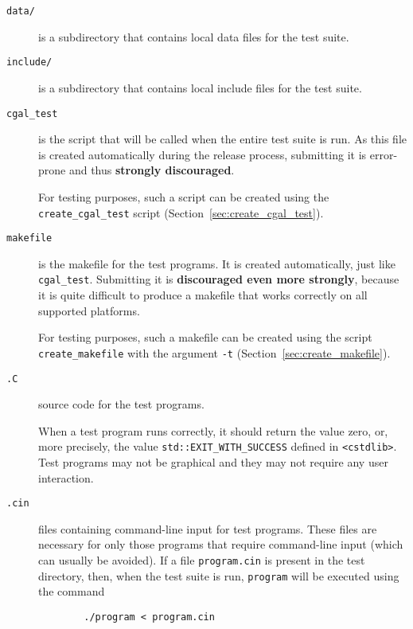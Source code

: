 \begin{description}
   \item[{\tt data/}] is a subdirectory that contains local data files for the
        test suite.
   \item[{\tt include/}] is a subdirectory that contains local include files for
        the test suite.
      \item[{\tt cgal\_test}] is the script that will be called when the entire
        test suite is run. As this file is created automatically
        during the release process, submitting it is error-prone and
        thus {\bf strongly discouraged}.
        
        For testing purposes, such a script can be created using the
        {\tt create\_cgal\_test}%
        script (Section~\ref{sec:create_cgal_test}).  

   \item[{\tt makefile}] 
        is the makefile for the test programs. It is created
        automatically, just like {\tt cgal\_test}. Submitting it is 
        {\bf discouraged even more strongly}, because it is quite difficult 
        to produce a makefile that works correctly on all supported platforms.
        
        For testing purposes, such a makefile can be created using the
        script
        {\tt create\_makefile}%
        with the argument {\tt -t} 
        (Section~\ref{sec:create_makefile}).
   \item[{\tt *.C}] source code for the test programs.

        When a test program runs correctly, it should return
         the
        value zero, or, more precisely, the value \verb|std::EXIT_WITH_SUCCESS|
        defined in \verb|<cstdlib>|.
        Test programs may not be graphical and they may not require any user 
        interaction.   
   \item[{\tt *.cin}] files containing command-line input for 
        test programs.  These files are necessary for only those programs 
        that require command-line input (which can usually be avoided).  
        If a file \texttt{program.cin} is 
        present in the test directory, then, when the test suite is run,
        \texttt{program} will be executed using the command
        \begin{verbatim}
        ./program < program.cin
        \end{verbatim}
\end{description} 

